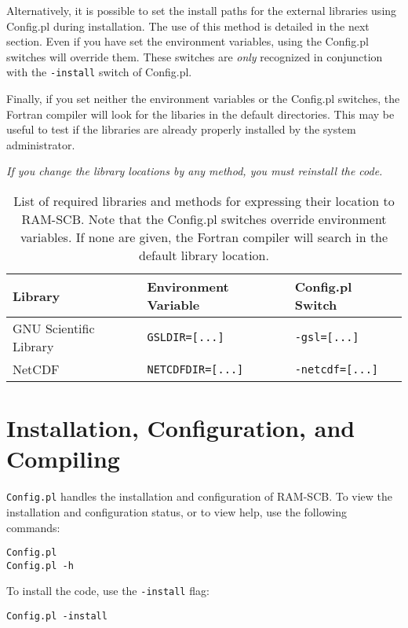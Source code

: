 Alternatively, it is possible to set the install paths for the external libraries using Config.pl during installation. The use of this method is detailed in the next section. Even if you have set the environment variables, using the Config.pl switches will override them. These switches are \emph{only} recognized in conjunction with the {\tt -install} switch of Config.pl.

Finally, if you set neither the environment variables or the Config.pl switches, the Fortran compiler will look for the libaries in the default directories. This may be useful to test if the libraries are already properly installed by the system administrator.  

\emph{If you change the library locations by any method, you must reinstall the code.} 

\begin{table}[ht]
  \centering
  \begin{tabular}{l l l}
  \hline\hline
  Library & Environment Variable & Config.pl Switch\\
  \hline
  GNU Scientific Library & {\tt GSLDIR=[...]} & {\tt -gsl=[...]}\\
  NetCDF & {\tt NETCDFDIR=[...]} & {\tt -netcdf=[...]}\\
  \end{tabular}
\caption{List of required libraries and methods for expressing their location to RAM-SCB. Note that the Config.pl switches override environment variables. If none are given, the Fortran compiler will search in the default library location.}
\label{tab:libs}
\end{table}

\section{Installation, Configuration, and Compiling \label{subchap:install}}
{\tt Config.pl} handles the installation and configuration of RAM-SCB. To view the installation and configuration status, or to view help, use the following commands:
\begin{verbatim}
Config.pl
Config.pl -h
\end{verbatim}

To install the code, use the {\tt -install} flag:

\begin{verbatim}
Config.pl -install
\end{verbatim}



